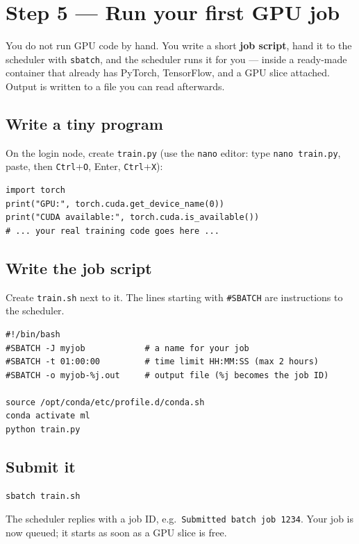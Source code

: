 \documentclass[11pt]{article}
\newcommand{\code}[1]{\texttt{#1}}
\begin{document}
\section{Step 5 --- Run your first GPU job}
You do not run GPU code by hand. You write a short \textbf{job script}, hand it to the scheduler with \code{sbatch}, and the scheduler runs it for you --- inside a ready-made container that already has PyTorch, TensorFlow, and a GPU slice attached. Output is written to a file you can read afterwards.

\subsection{Write a tiny program}
On the login node, create \code{train.py} (use the \code{nano} editor: type \code{nano train.py}, paste, then \code{Ctrl}+\code{O}, Enter, \code{Ctrl}+\code{X}):
\begin{lstlisting}[style=py]
import torch
print("GPU:", torch.cuda.get_device_name(0))
print("CUDA available:", torch.cuda.is_available())
# ... your real training code goes here ...
\end{lstlisting}

\subsection{Write the job script}
Create \code{train.sh} next to it. The lines starting with \code{\#SBATCH} are instructions to the scheduler.
\begin{lstlisting}
#!/bin/bash
#SBATCH -J myjob            # a name for your job
#SBATCH -t 01:00:00         # time limit HH:MM:SS (max 2 hours)
#SBATCH -o myjob-%j.out     # output file (%j becomes the job ID)

source /opt/conda/etc/profile.d/conda.sh
conda activate ml
python train.py
\end{lstlisting}

\subsection{Submit it}
\begin{lstlisting}
sbatch train.sh
\end{lstlisting}
The scheduler replies with a job ID, e.g.\ \code{Submitted batch job 1234}. Your job is now queued; it starts as soon as a GPU slice is free.
\end{document}
